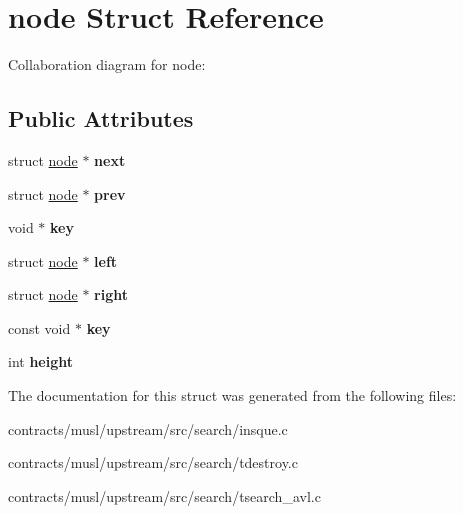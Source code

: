\hypertarget{structnode}{}\section{node Struct Reference}
\label{structnode}


Collaboration diagram for node\+:
\subsection*{Public Attributes}
\begin{DoxyCompactItemize}
\item 
\mbox{\label{structnode_aa3e8aa83f864292b5a01210f4453fcc0}} 
struct \mbox{\hyperlink{structnode}{node}} $\ast$ {\bfseries next}
\item 
\mbox{\label{structnode_a7ee3d227c728ce18a86e43ebc301046e}} 
struct \mbox{\hyperlink{structnode}{node}} $\ast$ {\bfseries prev}
\item 
\mbox{\label{structnode_a72c8a0c41b801c92db89c5078642f28b}} 
void $\ast$ {\bfseries key}
\item 
\mbox{\label{structnode_af7109e6ffd82cbbb705e486fd0ce92f0}} 
struct \mbox{\hyperlink{structnode}{node}} $\ast$ {\bfseries left}
\item 
\mbox{\label{structnode_a51e160f22dc6064bac4a4f9f1d931c2c}} 
struct \mbox{\hyperlink{structnode}{node}} $\ast$ {\bfseries right}
\item 
\mbox{\label{structnode_ad5c7d4cbb4e3bf585d109ac8f38abe71}} 
const void $\ast$ {\bfseries key}
\item 
\mbox{\label{structnode_a522298f219c14128a6027ee43046ea15}} 
int {\bfseries height}
\end{DoxyCompactItemize}


The documentation for this struct was generated from the following files\+:\begin{DoxyCompactItemize}
\item 
contracts/musl/upstream/src/search/insque.\+c\item 
contracts/musl/upstream/src/search/tdestroy.\+c\item 
contracts/musl/upstream/src/search/tsearch\+\_\+avl.\+c\end{DoxyCompactItemize}
